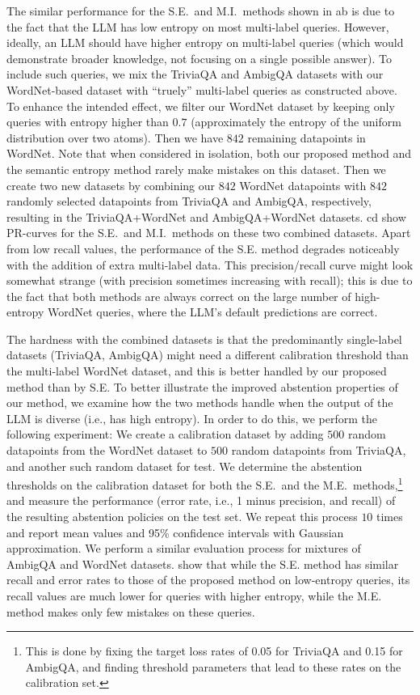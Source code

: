 \documentclass[a4paper]{article}
\theoremstyle{plain}
\theoremstyle{definition}
\theoremstyle{plain}
\begin{document}
The similar performance for the S.E.\ and M.I.\ methods shown in ab is due to the fact that the LLM has low entropy on most multi-label queries. However, ideally, an LLM should have higher entropy on multi-label queries (which would demonstrate broader knowledge, not focusing on a single possible answer). To include such queries, we mix the TriviaQA and AmbigQA datasets with our WordNet-based dataset with ``truely'' multi-label queries as constructed above. 
To enhance the intended effect, we filter our WordNet dataset by keeping only queries with entropy higher than $0.7$ (approximately the entropy of the uniform distribution over two atoms). Then we have $842$ remaining datapoints in WordNet.
Note that when considered in isolation, both our proposed method and the semantic entropy method rarely make mistakes on this dataset. 
Then we create two new datasets by combining our $842$ WordNet datapoints with $842$ randomly selected datapoints from TriviaQA and AmbigQA, respectively, resulting in the TriviaQA+WordNet and AmbigQA+WordNet datasets.
cd show PR-curves for the S.E.\ and M.I.\ methods on these two combined datasets. Apart from low recall values, the performance of the S.E. method degrades noticeably with the addition of extra multi-label data. This precision/recall curve might look somewhat strange (with precision sometimes increasing with recall); this is due to the fact that both methods are always correct on the large number of high-entropy WordNet queries, where the LLM's default predictions are correct.

The hardness with the combined datasets is that the predominantly single-label datasets (TriviaQA, AmbigQA) might need a different calibration threshold than the multi-label WordNet dataset, and this is better handled by our proposed method than by S.E.
To better illustrate the improved abstention properties of our method, we examine how the two methods handle when the output of the LLM is diverse (i.e., has high entropy). In order to do this, we perform the following experiment: We create a calibration dataset by adding $500$ random datapoints from the WordNet dataset to $500$ random datapoints from TriviaQA, and another such random dataset for test. We determine the abstention thresholds on the calibration dataset for both the S.E.\ and the M.E.\ methods,\footnote{This is done by fixing the target loss rates of 0.05 for TriviaQA and 0.15 for AmbigQA, and finding threshold parameters that lead to these rates on the calibration set.}
and measure the performance (error rate, i.e., 1 minus precision, and recall) of the resulting abstention policies on the test set. We repeat this process $10$ times and report mean values and 95\% confidence intervals with Gaussian approximation. We perform a similar evaluation process for mixtures of AmbigQA and WordNet datasets.  show that while the S.E. method has similar recall and error rates to those of the proposed method on low-entropy queries, its recall values are much lower for queries with higher entropy, while the M.E. method makes only few mistakes on these queries.
\end{document}
